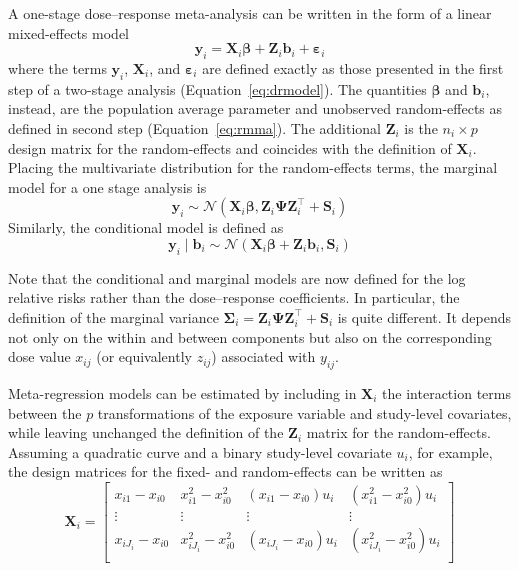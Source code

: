 \documentclass[11pt,a4paper,twoside,openany]{book}\usepackage{knitr}
\begin{document}
{A one-stage dose--response meta-analysis can be written in the form of a linear mixed-effects model
\begin{equation}
\mathbf{y}_{i} = \mathbf{X}_{i} \boldsymbol{\beta} + \mathbf{Z}_{i}  \mathbf{b}_i + \boldsymbol{\varepsilon}_{i}
\label{eq:onestage}
\end{equation}
\noindent where the terms $\mathbf{y}_{i}$, $\mathbf{X}_{i}$, and $\boldsymbol{\varepsilon}_{i}$ are defined exactly as those presented in the first step of a two-stage analysis (Equation~\ref{eq:drmodel}). The quantities $\boldsymbol{\beta}$ and $\mathbf{b}_i$, instead, are the population average parameter and unobserved random-effects as defined in second step (Equation~\ref{eq:rmma}). The additional $\mathbf{Z}_{i}$ is the $n_i \times p$ design matrix for the random-effects and coincides with the definition of $\mathbf{X}_{i}$.
Placing the multivariate distribution for the random-effects terms, the marginal model for a one stage analysis is
\begin{equation}
\mathbf{y}_{i} \sim \mathcal{N} \left( \mathbf{X}_{i} \boldsymbol{\beta},  \mathbf{Z}_{i} \boldsymbol{\Psi} \mathbf{Z}_{i}^\top  + \mathbf{S}_i \right)
\label{eq:marginal_os}
\end{equation}
\noindent Similarly, the conditional model is defined as
\begin{equation}
\mathbf{y}_{i} \mid \boldsymbol{b}_i \sim \mathcal{N} \left( \mathbf{X}_{i} \boldsymbol{\beta} + \mathbf{Z}_{i} \boldsymbol{b}_i,  \mathbf{S}_i \right)
\label{eq:conditional_os}
\end{equation}

\noindent Note that the conditional and marginal models are now defined for the log relative risks rather than the dose--response coefficients. In particular, the definition of the marginal variance $\boldsymbol{\Sigma}_i  = \mathbf{Z}_{i} \boldsymbol{\Psi} \mathbf{Z}_{i}^\top  + \mathbf{S}_i$ is quite different. It depends not only on the within and between components but also on the corresponding dose value $x_{ij}$ (or equivalently $z_{ij}$) associated with $y_{ij}$.

Meta-regression models can be estimated by including in $\mathbf{X}_{i}$ the interaction terms between the $p$ transformations of the exposure variable and study-level covariates, while leaving unchanged the definition of the $\mathbf{Z}_{i}$ matrix for the random-effects. Assuming a quadratic curve and a binary study-level covariate $u_i$, for example, the design matrices for the fixed- and random-effects can be written as
\begin{equation*}
\mathbf{X}_i =
	\begin{bmatrix}
		x_{i1} - x_{i0}  & x_{i1}^2 - x_{i0}^2 & \left(x_{i1} - x_{i0}\right) u_i &  \left( x_{i1}^2 - x_{i0}^2\right) u_i \\
		\vdots & \vdots & \vdots & \vdots \\
		x_{iJ_i} - x_{i0}  & x_{iJ_i}^2 - x_{i0}^2 & \left(x_{iJ_i} - x_{i0}\right) u_i  & \left(x_{iJ_i}^2 - x_{i0}^2\right) u_i \\
	\end{bmatrix}
\end{equation*} 

}
\end{document}
